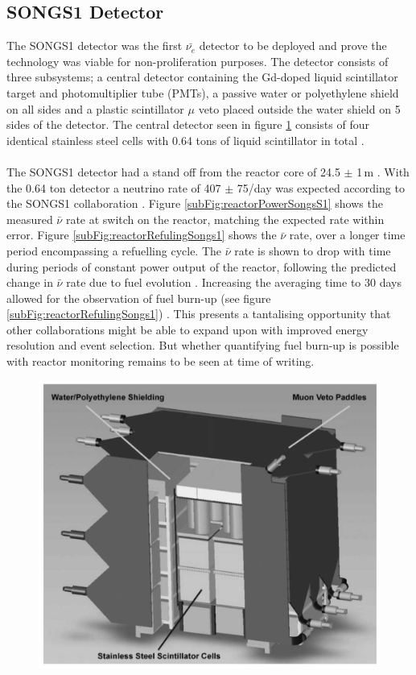 \subsection{SONGS1 Detector}
The SONGS1 detector \cite{Bowden_2007} was the first $\bar{\nu_e}$ detector to be deployed and prove the technology was viable for non-proliferation purposes. The detector consists of three subsystems; a central detector containing the Gd-doped liquid scintillator target and photomultiplier tube (PMTs), a passive water or polyethylene shield on all sides and a plastic scintillator $\mu$ veto placed outside the water shield on 5 sides of the detector. The central detector seen in figure \ref{fig:SongsS1Detector} consists of four identical stainless steel cells with 0.64 tons of liquid scintillator in total \cite{Bowden_2007}. 
\\\\The SONGS1 detector had a stand off from the reactor core of 24.5 $\pm$ 1\,m \cite{Bowden_2007}. With the 0.64 ton detector a neutrino rate of 407 $\pm$ 75/day was expected according to the SONGS1 collaboration \cite{Bowden_2007}. Figure \ref{subFig:reactorPowerSongsS1} shows the measured $\bar{\nu}$ rate at switch on the reactor, matching the expected rate within error. Figure \ref{subFig:reactorRefulingSongs1} shows the $\bar{\nu}$ rate, over a longer time period encompassing a refuelling cycle. The $\bar{\nu}$ rate is shown to drop with time during periods of constant power output of the reactor, following the predicted change in $\bar{\nu}$ rate due to fuel evolution \cite{Bowden_2008}. Increasing the averaging time to 30 days allowed for the observation of fuel burn-up (see figure \ref{subFig:reactorRefulingSongs1}) \cite{Bowden_2008}. This presents a tantalising opportunity that other collaborations might be able to expand upon with improved energy resolution and event selection. But whether quantifying fuel burn-up is possible with reactor monitoring remains to be seen at time of writing. 

\begin{figure}[!h]
 \centering
 \includegraphics[width=0.5\linewidth]{Chapter1/Figs/SongsS1Detector.jpg}
 \label{fig:SongsS1Detector}
\end{figure}

